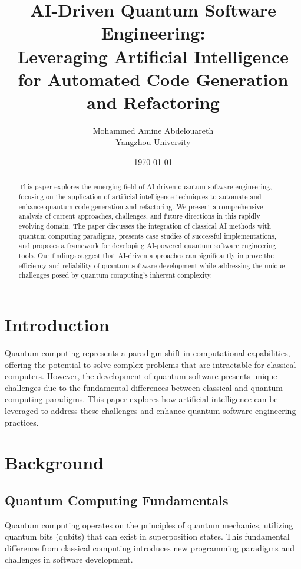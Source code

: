 \documentclass[12pt,a4paper]{article}
\title{AI-Driven Quantum Software Engineering:\\
Leveraging Artificial Intelligence for Automated Code Generation and Refactoring}
\author{Mohammed Amine Abdelouareth\\
Yangzhou University}
\date{\today}
\begin{document}


\maketitle

\begin{abstract}
This paper explores the emerging field of AI-driven quantum software engineering, focusing on the application of artificial intelligence techniques to automate and enhance quantum code generation and refactoring. We present a comprehensive analysis of current approaches, challenges, and future directions in this rapidly evolving domain. The paper discusses the integration of classical AI methods with quantum computing paradigms, presents case studies of successful implementations, and proposes a framework for developing AI-powered quantum software engineering tools. Our findings suggest that AI-driven approaches can significantly improve the efficiency and reliability of quantum software development while addressing the unique challenges posed by quantum computing's inherent complexity.
\end{abstract}

\section{Introduction}
Quantum computing represents a paradigm shift in computational capabilities, offering the potential to solve complex problems that are intractable for classical computers. However, the development of quantum software presents unique challenges due to the fundamental differences between classical and quantum computing paradigms. This paper explores how artificial intelligence can be leveraged to address these challenges and enhance quantum software engineering practices.

\section{Background}
\subsection{Quantum Computing Fundamentals}
Quantum computing operates on the principles of quantum mechanics, utilizing quantum bits (qubits) that can exist in superposition states. This fundamental difference from classical computing introduces new programming paradigms and challenges in software development.
\end{document}
